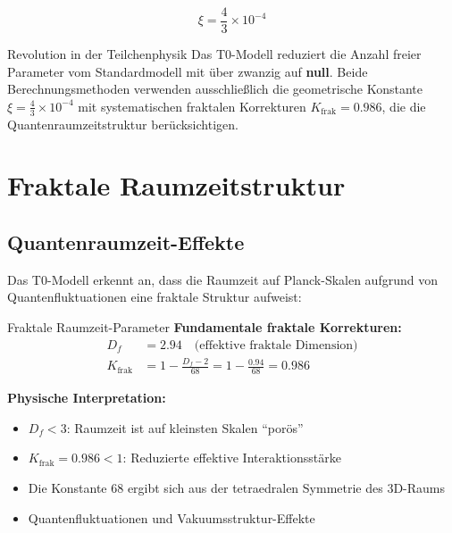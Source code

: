 \documentclass[12pt,a4paper]{article}
\newcommand{\xipar}{\xi}
\begin{document}
	\begin{equation}
		\xi = \frac{4}{3} \times 10^{-4}
		\label{eq:fundamental_constant}
	\end{equation}
	
	\begin{wichtig}{Revolution in der Teilchenphysik}{}
		Das T0-Modell reduziert die Anzahl freier Parameter vom Standardmodell mit \"u{}ber zwanzig auf \textbf{null}. Beide Berechnungsmethoden verwenden ausschlie\ss{}lich die geometrische Konstante $\xipar = \frac{4}{3} \times 10^{-4}$ mit systematischen fraktalen Korrekturen $K_{\text{frak}} = 0.986$, die die Quantenraumzeitstruktur ber\"u{}cksichtigen.
	\end{wichtig}
	
	\section{Fraktale Raumzeitstruktur}
	\label{sec:fractal_spacetime}
	
	\subsection{Quantenraumzeit-Effekte}
	\label{subsec:quantum_spacetime}
	
	Das T0-Modell erkennt an, dass die Raumzeit auf Planck-Skalen aufgrund von Quantenfluktuationen eine fraktale Struktur aufweist:
	
	\begin{fraktal}{Fraktale Raumzeit-Parameter}{}
		\textbf{Fundamentale fraktale Korrekturen:}
		\begin{align}
			D_f &= 2.94 \quad \text{(effektive fraktale Dimension)} \\
			K_{\text{frak}} &= 1 - \frac{D_f - 2}{68} = 1 - \frac{0.94}{68} = 0.986
		\end{align}
		
		\textbf{Physische Interpretation:}
		\begin{itemize}
			\item $D_f < 3$: Raumzeit ist auf kleinsten Skalen ``por\"o{}s''
			\item $K_{\text{frak}} = 0.986 < 1$: Reduzierte effektive Interaktionsst\"a{}rke
			\item Die Konstante 68 ergibt sich aus der tetraedralen Symmetrie des 3D-Raums
			\item Quantenfluktuationen und Vakuumsstruktur-Effekte
		\end{itemize}
	\end{fraktal}
	
\end{document}
